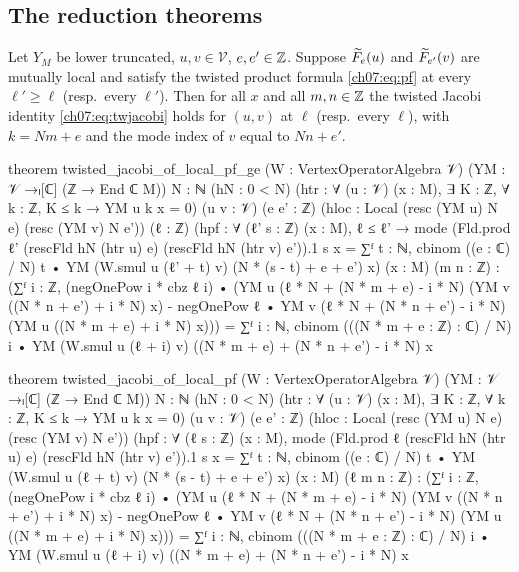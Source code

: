 \subsection{The reduction theorems}

\begin{theorem}\label{ch07:thm:reduction1}
Let $Y_M$ be lower truncated, $u,v\in\mathcal V$, $e,e'\in{\mathbb{Z}}$. Suppose $\widetilde{F}_e(u)$ and
$\widetilde{F}_{e'}(v)$ are mutually local and satisfy the twisted product formula \eqref{ch07:eq:pf}
at every $\ell'\ge\ell$ (resp.\ every $\ell'$). Then for all $x$ and all $m,n\in{\mathbb{Z}}$ the twisted
Jacobi identity \eqref{ch07:eq:twjacobi} holds for $(u,v)$ at $\ell$ (resp.\ every $\ell$), with
$k=Nm+e$ and the mode index of $v$ equal to $Nn+e'$.
\end{theorem}

\begin{leancode}
theorem twisted_jacobi_of_local_pf_ge (W : VertexOperatorAlgebra 𝒱)
    (YM : 𝒱 →ₗ[ℂ] (ℤ → End ℂ M))
    {N : ℕ} (hN : 0 < N) (htr : ∀ (u : 𝒱) (x : M), ∃ K : ℤ, ∀ k : ℤ, K ≤ k → YM u k x = 0)
    (u v : 𝒱) (e e' : ℤ)
    (hloc : Local (resc (YM u) N e) (resc (YM v) N e')) (ℓ : ℤ)
    (hpf : ∀ (ℓ' s : ℤ) (x : M), ℓ ≤ ℓ' →
      mode (Fld.prod ℓ' (rescFld hN (htr u) e) (rescFld hN (htr v) e')).1 s x
        = ∑ᶠ t : ℕ, cbinom ((e : ℂ) / N) t •
            YM (W.smul u (ℓ' + t) v) (N * (s - t) + e + e') x)
    (x : M) (m n : ℤ) :
    (∑ᶠ i : ℤ, (negOnePow i * cbz ℓ i) •
        (YM u (ℓ * N + (N * m + e) - i * N) (YM v ((N * n + e') + i * N) x)
          - negOnePow ℓ • YM v (ℓ * N + (N * n + e') - i * N) (YM u ((N * m + e) + i * N) x)))
      = ∑ᶠ i : ℕ, cbinom (((N * m + e : ℤ) : ℂ) / N) i •
          YM (W.smul u (ℓ + i) v) ((N * m + e) + (N * n + e') - i * N) x

theorem twisted_jacobi_of_local_pf (W : VertexOperatorAlgebra 𝒱) (YM : 𝒱 →ₗ[ℂ] (ℤ → End ℂ M))
    {N : ℕ} (hN : 0 < N) (htr : ∀ (u : 𝒱) (x : M), ∃ K : ℤ, ∀ k : ℤ, K ≤ k → YM u k x = 0)
    (u v : 𝒱) (e e' : ℤ)
    (hloc : Local (resc (YM u) N e) (resc (YM v) N e'))
    (hpf : ∀ (ℓ s : ℤ) (x : M),
      mode (Fld.prod ℓ (rescFld hN (htr u) e) (rescFld hN (htr v) e')).1 s x
        = ∑ᶠ t : ℕ, cbinom ((e : ℂ) / N) t •
            YM (W.smul u (ℓ + t) v) (N * (s - t) + e + e') x)
    (x : M) (ℓ m n : ℤ) :
    (∑ᶠ i : ℤ, (negOnePow i * cbz ℓ i) •
        (YM u (ℓ * N + (N * m + e) - i * N) (YM v ((N * n + e') + i * N) x)
          - negOnePow ℓ • YM v (ℓ * N + (N * n + e') - i * N) (YM u ((N * m + e) + i * N) x)))
      = ∑ᶠ i : ℕ, cbinom (((N * m + e : ℤ) : ℂ) / N) i •
          YM (W.smul u (ℓ + i) v) ((N * m + e) + (N * n + e') - i * N) x
\end{leancode}

